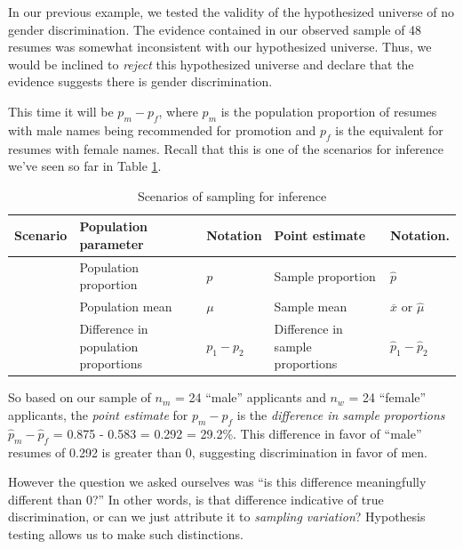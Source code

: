 \documentclass[
]{book}
\begin{document}
In our previous example, we tested the validity of the hypothesized universe of no gender discrimination. The evidence contained in our observed sample of 48 resumes was somewhat inconsistent with our hypothesized universe. Thus, we would be inclined to \emph{reject} this hypothesized universe and declare that the evidence suggests there is gender discrimination.

This time it will be \(p_{m} - p_{f}\), where \(p_{m}\) is the population proportion of resumes with male names being recommended for promotion and \(p_{f}\) is the equivalent for resumes with female names. Recall that this is one of the scenarios for inference we've seen so far in Table \ref{tab:table-diff-prop}.

\begin{table}[!h]

\caption{\label{tab:table-diff-prop}Scenarios of sampling for inference}
\centering
\fontsize{10}{12}\selectfont
\begin{tabular}[t]{>{\raggedleft\arraybackslash}p{0.5in}>{\raggedright\arraybackslash}p{0.7in}>{\raggedright\arraybackslash}p{1in}>{\raggedright\arraybackslash}p{1.1in}>{\raggedright\arraybackslash}p{1in}}
\toprule
Scenario & Population parameter & Notation & Point estimate & Notation.\\
\midrule
1 & Population proportion & $p$ & Sample proportion & $\widehat{p}$\\
2 & Population mean & $\mu$ & Sample mean & $\overline{x}$ or $\widehat{\mu}$\\
3 & Difference in population proportions & $p_1 - p_2$ & Difference in sample proportions & $\widehat{p}_1 - \widehat{p}_2$\\
\bottomrule
\end{tabular}
\end{table}

So based on our sample of \(n_m\) = 24 ``male'' applicants and \(n_w\) = 24 ``female'' applicants, the \emph{point estimate} for \(p_{m} - p_{f}\) is the \emph{difference in sample proportions} \(\widehat{p}_{m} -\widehat{p}_{f}\) = 0.875 - 0.583 = 0.292 = 29.2\%. This difference in favor of ``male'' resumes of 0.292 is greater than 0, suggesting discrimination in favor of men.

However the question we asked ourselves was ``is this difference meaningfully different than 0?'' In other words, is that difference indicative of true discrimination, or can we just attribute it to \emph{sampling variation}? Hypothesis testing allows us to make such distinctions.
\end{document}
